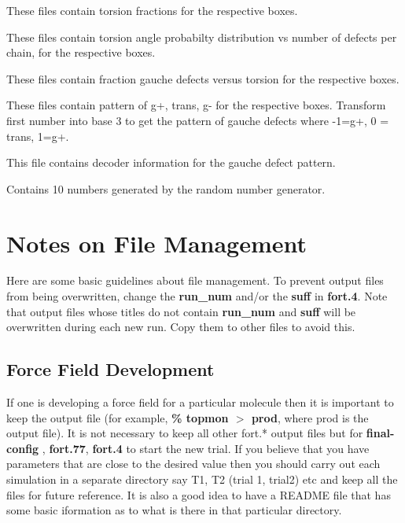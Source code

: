 \documentclass[12pt,letterpaper]{article}
\begin{document}
{{{{{{{ These files contain torsion fractions
for the respective boxes.

 These
files contain torsion angle probabilty distribution vs number of
defects per chain, for the respective boxes.

 These files contain fraction gauche defects versus
torsion for the respective boxes.

 These
files contain pattern of g+, trans, g- for the respective
boxes. Transform first number into base 3 to get the pattern of gauche
defects where -1=g+, 0 = trans, 1=g+.

 This file contains decoder information for
the gauche defect pattern.

 Contains 10 numbers generated by the 
random number generator. 

\section{Notes on File Management}
\noindent Here are some basic guidelines about file management. 
To prevent output files from being overwritten, change the {\bf run\_num} and/or
the {\bf suff} in {\bf fort.4}.  Note that output files whose titles do not contain {\bf run\_num}
and {\bf suff} will be overwritten during each new run.  Copy them to other files to avoid this.

\subsection{Force Field Development} If one is developing a force
field for a particular molecule then it is important to keep the
output file (for example, {\bf \% topmon $>$ prod}, where prod is the
output file). It is not necessary to keep all other fort.* output
files but for {\bf final-config} , {\bf fort.77}, {\bf fort.4} to
start the new trial. If you believe that you have parameters that are
close to the desired value then you should carry out each simulation
in a separate directory say T1, T2 (trial 1, trial2) etc and keep all
the files for future reference. It is also a good idea to have a
README file that has some basic iformation as to what is there in that
particular directory.
 
}}}}}}}
\end{document}
